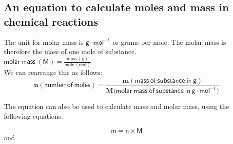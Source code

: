             \subsection*{An equation to calculate moles and mass in chemical reactions}
            \nopagebreak
      \label{m38717*id277432}The unit for molar mass is $\mathsf{g} \cdot \mathsf{mol}^{-1}$ or grams per mole. The molar mass is therefore the mass of one mole of substance. \\
$\mathsf{molar ~mass ~(M)} = \frac{\mathsf{mass ~(g)}}{\mathsf{mole ~(mol)}}$ \\
We can rearrange this as follows:
      \label{m38717*id277436}\nopagebreak\noindent{}
    \begin{equation*}
    \mathbf{n} \mathsf{(number ~of ~moles)} = \frac{\mathbf{m}\mathsf{(mass ~of ~substance ~in ~g)}}{\mathbf{M} \mathsf{(molar ~mass ~of ~substance ~in }~\mathsf{g}\cdot\mathsf{mol}^{-1}\mathsf{)}}
      \end{equation*}
\label{m38717*notfhsst!!!underscore!!!id374}
	\par
      \label{m38717*id277555}The equation can also be used to calculate mass and molar mass, using the following equations:\par 
      \label{m38717*id277559}\nopagebreak\noindent{}
        
    \begin{equation*}
    \mathsf{m}=\mathsf{n}\ensuremath{\times}\mathsf{M}
      \end{equation*}
      \label{m38717*id277579}and\par 
      \label{m38717*id277584}\nopagebreak\noindent{}
        
